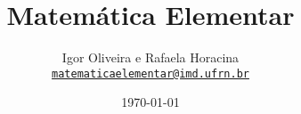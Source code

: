 %
%


%
%

\usepackage[utf8]{inputenc}
\usepackage[T1]{fontenc}

\usepackage[brazil]{babel}

\usepackage{amsmath}
\usepackage{amsthm}
\usepackage{amssymb}

\usepackage{csquotes}

\usepackage{hyperref}
\usepackage{tikz}
\usepackage{yfonts}
\usepackage{colortbl}
\usepackage{ragged2e}
\usepackage{helvet}
\usepackage{verbatim}


%
%




%
%

\usepackage{macros/macros}


%
%

\theoremstyle{plain}
\newtheorem{teorema}{Teorema}

\theoremstyle{definition}
\newtheorem{definicao}[teorema]{Definição}

\theoremstyle{remark}
\newtheorem{obs}[teorema]{Observação}
\newtheorem{observacao}[teorema]{Observação}
\newtheorem{corolario}[teorema]{Corolário}
\newtheorem{exemplo}[teorema]{Exemplo}
\newtheorem{lema}[teorema]{Lema}
\newtheorem{proposicao}[teorema]{Proposição}

\newenvironment{exercicio}{\stepcounter{exercicios} \textbf{\arabic{exercicios}}.}{}

\newcommand{\Ex}[1]{\begin{exercicio}#1\end{exercicio}}

%
%

\newcommand{\capitulo}[1]{\lecture[#1]{Capítulo}}
\newcommand{\aula}[1]{\subtitle{#1}}
\newcommand{\autor}{Igor Oliveira e Rafaela Horacina}
\newcommand{\email}{\href{mailto:matematicaelementar@imd.ufrn.br}{\texttt{matematicaelementar@imd.ufrn.br}}}
\newcommand{\disciplina}{Matemática Elementar}
\newcommand{\codigo}{IMD1001}

\title{\disciplina}
\date{\today}
\author[\autor]
{
    \autor\\
    \email
}

